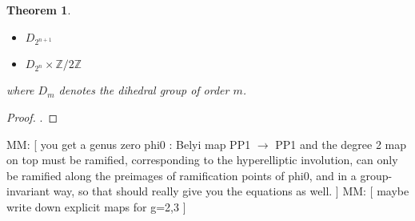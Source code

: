\documentclass{dcthesis}
\newcommand{\PP}{\mathbb P}
\newcommand{\CC}{\mathbb C}
\newcommand{\ZZ}{\mathbb Z}
\newcommand{\mm}[1]{{\color{blue} \sf MM: [#1]}}
\DeclareMathOperator{\Aut}{Aut}
\DeclareMathOperator{\PGL}{PGL}
\newtheorem{theorem}[prop]{Theorem}
\theoremstyle{definition}
\theoremstyle{remark}
\numberwithin{equation}{section}
\numberwithin{figure}{section}
\begin{document}
{{\begin{theorem}
\begin{itemize}
          $\ZZ / 2^n\ZZ\times\ZZ / 2\ZZ$
        \item
          $D_{2^{n+1}}$
        \item
          $D_{2^n}\times\ZZ / 2\ZZ$
      \end{itemize}
      where $D_m$ denotes the dihedral group of order $m$.
    \end{theorem}
    \begin{proof}
      \cite[Theorem 2.1]{hyperelliptic}.
    \end{proof}
    \mm{
      you get a genus zero phi0 : Belyi map
      PP1 $\to$ PP1 and the degree 2 map on top must be ramified,
      corresponding to the hyperelliptic involution, can only be ramified
      along the preimages of ramification points of phi0, and in a
      group-invariant way, so that should really give you the equations as
      well.
    }
    \newline
    \mm{
      maybe write down explicit maps for g=2,3
    }
  }
}
\end{document}

